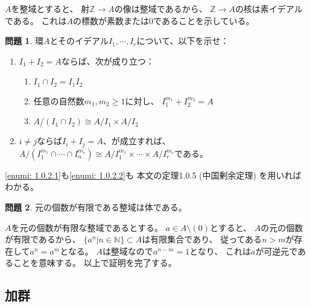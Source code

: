 \documentclass[uplatex]{jsarticle}
\makeatletter
\theoremstyle{definition}
\newtheorem{prob}[prob]{問題}
\renewenvironment{proof}[1][\proofname]{
  \pushQED{\qed}%
  \normalfont \topsep6\p@\@plus6\p@\relax
  \trivlist
  \item[\hskip\labelsep
    #1\@addpunct{\textbf{.}}]\ignorespaces
}{%
  \popQED\endtrivlist\@endpefalse
}
\providecommand{\proofname}{証明}
\newcommand\Z{\mathbb{Z}}
\newcommand\N{\mathbb{N}}
\makeatother
\begin{document}
\begin{proof}
  \(A\)を整域とすると、
  射\(\Z\to A\)の像は整域であるから、
  \(\Z\to A\)の核は素イデアルである。
  これは\(A\)の標数が素数または\(0\)であることを示している。
\end{proof}

\begin{prob}\label{prob: 1.0.2}
  環\(A\)とそのイデアル\(I_1,\cdots, I_r\)について、以下を示せ：
  \begin{enumerate}
    \item \label{enumi: 1.0.2.1}
    \(I_1 + I_2 = A\)ならば、次が成り立つ：
    \begin{enumerate}
      \item \label{enumii: 1.0.2.1.1}
      \(I_1\cap I_2 = I_1I_2\)
      \item \label{enumii: 1.0.2.1.2}
      任意の自然数\(m_1,m_2 \geq 1\)に対し、
      \(I_1^{m_1} + I_2^{m_2} = A\)
      \item \label{enumii: 1.0.2.1.3}
      \(A/(I_1\cap I_2) \cong A/I_1 \times A/I_2\)
    \end{enumerate}
    \item \label{enumi: 1.0.2.2}
    \(i\neq j\)ならば\(I_i+I_j = A\)、が成立すれば、
    \(A/(I_1^{m_1}\cap \cdots \cap I_n^{m_r}) \cong
    A/I_1^{m_1}\times \cdots \times A/I_r^{m_r}\)である。
  \end{enumerate}
\end{prob}

\begin{proof}
  \ref{enumi: 1.0.2.1}も\ref{enumi: 1.0.2.2}も
  本文の定理1.0.5 (中国剰余定理) を用いればわかる。
\end{proof}


\begin{prob}\label{prob: 1.0.3}
  元の個数が有限である整域は体である。
\end{prob}

\begin{proof}
  \(A\)を元の個数が有限な整域であるとする。
  \(a\in A\setminus (0)\)とすると、
  \(A\)の元の個数が有限であるから、
  \(\{a^n | n\in \N\}\subset A\)は有限集合であり、
  従ってある\(n > m\)が存在して\(a^n = a^m\)となる。
  \(A\)は整域なので\(a^{n-m} = 1\)となり、
  これは\(a\)が可逆元であることを意味する。
  以上で証明を完了する。
\end{proof}



\subsection{加群}
\end{document}

